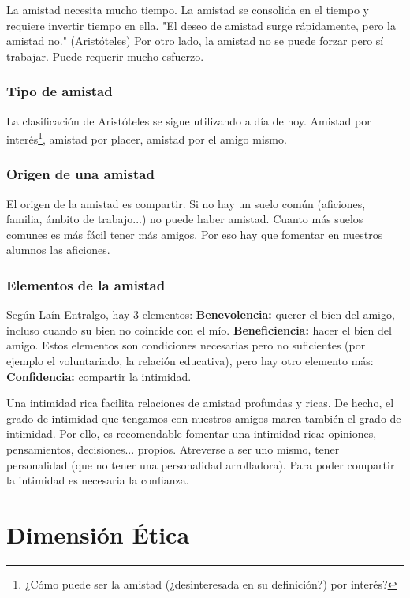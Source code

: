 \documentclass[palatino]{apuntesURJC}
\begin{document}
La amistad necesita mucho tiempo.
%
La amistad se consolida en el tiempo y requiere invertir tiempo en ella. 
%
"El deseo de amistad surge rápidamente, pero la amistad no." (Aristóteles)
%
Por otro lado,
%
la amistad no se puede forzar pero sí trabajar. 
%
Puede requerir mucho esfuerzo.


\subsubsection{Tipo de amistad}

La clasificación de Aristóteles se sigue utilizando a día de hoy.
%
Amistad por interés\footnote{¿Cómo puede ser la amistad (¿desinteresada en su definición?) por interés?}, amistad por placer, amistad por el amigo mismo.


\subsubsection{Origen de una amistad}

El origen de la amistad es compartir. 
%
Si no hay un suelo común (aficiones, familia, ámbito de trabajo...) no puede haber amistad.
%
Cuanto más suelos comunes es más fácil tener más amigos.
%
Por eso hay que fomentar en nuestros alumnos las aficiones.

\subsubsection{Elementos de la amistad}

Según Laín Entralgo, hay 3 elementos:
%
\textbf{Benevolencia:} querer el bien del amigo, incluso cuando su bien no coincide con el mío.
%
\textbf{Beneficiencia:} hacer el bien del amigo.
%
Estos elementos son condiciones necesarias pero no suficientes (por ejemplo el voluntariado, la relación educativa), pero hay otro elemento más:
%
\textbf{Confidencia:} compartir la intimidad. 


Una intimidad rica facilita relaciones de amistad profundas y ricas.
%
De hecho, el grado de intimidad que tengamos con nuestros amigos marca también el grado de intimidad. 
%
Por ello, es recomendable fomentar una intimidad rica: opiniones, pensamientos, decisiones... propios.
%
Atreverse a ser uno mismo, tener personalidad (que no tener una personalidad arrolladora).
%
Para poder compartir la intimidad es necesaria la confianza.



\section{Dimensión Ética}
\end{document}
